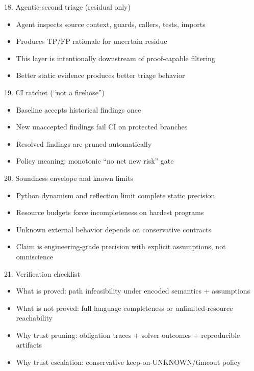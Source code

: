 \documentclass[aspectratio=169]{beamer}
\begin{document}
\begin{frame}{18. Agentic-second triage (residual only)}
\begin{itemize}
  \item Agent inspects source context, guards, callers, tests, imports
  \item Produces TP/FP rationale for uncertain residue
  \item This layer is intentionally downstream of proof-capable filtering
  \item Better static evidence produces better triage behavior
\end{itemize}
\end{frame}

\begin{frame}{19. CI ratchet (``not a firehose'')}
\begin{itemize}
  \item Baseline accepts historical findings once
  \item New unaccepted findings fail CI on protected branches
  \item Resolved findings are pruned automatically
  \item Policy meaning: monotonic ``no net new risk'' gate
\end{itemize}
\end{frame}

\begin{frame}{20. Soundness envelope and known limits}
\begin{itemize}
  \item Python dynamism and reflection limit complete static precision
  \item Resource budgets force incompleteness on hardest programs
  \item Unknown external behavior depends on conservative contracts
  \item Claim is engineering-grade precision with explicit assumptions, not omniscience
\end{itemize}
\end{frame}

\begin{frame}{21. Verification checklist}
\begin{itemize}
  \item What is proved: path infeasibility under encoded semantics + assumptions
  \item What is not proved: full language completeness or unlimited-resource reachability
  \item Why trust pruning: obligation traces + solver outcomes + reproducible artifacts
  \item Why trust escalation: conservative keep-on-UNKNOWN/timeout policy
\end{itemize}
\end{frame}
\end{document}
